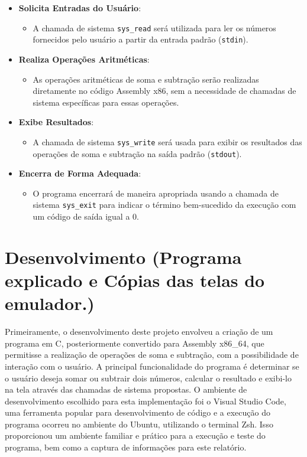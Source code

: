 \documentclass[
	12pt,				%
	openright,			%
	oneside,			%
	a4paper,			%
	chapter=TITLE,		%
	english,			%
	french,				%
	spanish,			%
	brazil				%
	]{abntex2}
\theoremstyle{definition}
\begin{document}
\begin{itemize}
	\item \textbf{Solicita Entradas do Usuário}:
	  \begin{itemize}
		\item A chamada de sistema \texttt{sys\_read} será utilizada para ler os números fornecidos pelo usuário a partir da entrada padrão (\texttt{stdin}).
	  \end{itemize}
	\item \textbf{Realiza Operações Aritméticas}:
	  \begin{itemize}
		\item As operações aritméticas de soma e subtração serão realizadas diretamente no código Assembly x86, sem a necessidade de chamadas de sistema específicas para essas operações.
	  \end{itemize}
	\item \textbf{Exibe Resultados}:
	  \begin{itemize}
		\item A chamada de sistema \texttt{sys\_write} será usada para exibir os resultados das operações de soma e subtração na saída padrão (\texttt{stdout}).
	  \end{itemize}
	\item \textbf{Encerra de Forma Adequada}:
	  \begin{itemize}
		\item O programa encerrará de maneira apropriada usando a chamada de sistema \texttt{sys\_exit} para indicar o término bem-sucedido da execução com um código de saída igual a 0.
	  \end{itemize}
  \end{itemize}
  

\chapter{Desenvolvimento (Programa explicado e Cópias das telas do emulador.)}

	Primeiramente, o desenvolvimento deste projeto envolveu a criação de um programa em C, 
	posteriormente convertido para Assembly x86_64,  que
	permitisse a realização de operações de soma e subtração, com a possibilidade de interação 
	com o usuário. A principal funcionalidade do programa é determinar se o usuário deseja somar
	ou subtrair dois números, calcular o resultado e exibi-lo na tela através das chamadas de sistema propostas. 
	O ambiente de desenvolvimento escolhido para esta implementação foi o Visual Studio Code, uma ferramenta popular para 
	desenvolvimento de código e a execução do programa ocorreu no ambiente do Ubuntu, utilizando o
	terminal Zsh. Isso proporcionou um ambiente familiar e prático para a execução e teste do programa, 
	bem como a captura de informações para este relatório.
\end{document}
